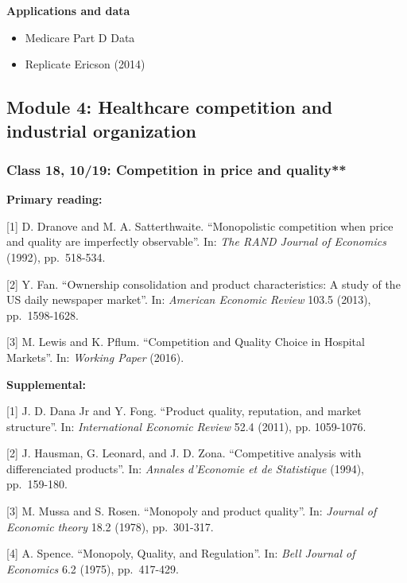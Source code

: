 \documentclass[11pt,]{article}
\providecommand{\tightlist}{%
  \setlength{\itemsep}{0pt}\setlength{\parskip}{0pt}}
\begin{document}
\textbf{Applications and data}

\begin{itemize}
\tightlist
\item
  Medicare Part D Data
\item
  Replicate Ericson (2014)
\end{itemize}

\hypertarget{module-4-healthcare-competition-and-industrial-organization}{%
\subsection{Module 4: Healthcare competition and industrial
organization}\label{module-4-healthcare-competition-and-industrial-organization}}

\hypertarget{class-18-1019-competition-in-price-and-quality}{%
\subsubsection{Class 18, 10/19: Competition in price and
quality**}\label{class-18-1019-competition-in-price-and-quality}}

\textbf{Primary reading:}

{[}1{]} D. Dranove and M. A. Satterthwaite. ``Monopolistic competition
when price and quality are imperfectly observable''. In: \emph{The RAND
Journal of Economics} (1992), pp.~518-534.

{[}2{]} Y. Fan. ``Ownership consolidation and product characteristics: A
study of the US daily newspaper market''. In: \emph{American Economic
Review} 103.5 (2013), pp.~1598-1628.

{[}3{]} M. Lewis and K. Pflum. ``Competition and Quality Choice in
Hospital Markets''. In: \emph{Working Paper} (2016).

\textbf{Supplemental:}

{[}1{]} J. D. Dana Jr and Y. Fong. ``Product quality, reputation, and
market structure''. In: \emph{International Economic Review} 52.4
(2011), pp. 1059-1076.

{[}2{]} J. Hausman, G. Leonard, and J. D. Zona. ``Competitive analysis
with differenciated products''. In: \emph{Annales d'Economie et de
Statistique} (1994), pp.~159-180.

{[}3{]} M. Mussa and S. Rosen. ``Monopoly and product quality''. In:
\emph{Journal of Economic theory} 18.2 (1978), pp.~301-317.

{[}4{]} A. Spence. ``Monopoly, Quality, and Regulation''. In: \emph{Bell
Journal of Economics} 6.2 (1975), pp.~417-429.
\end{document}
